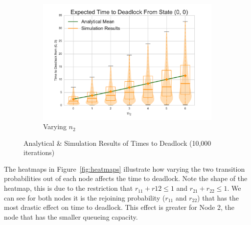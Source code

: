 \documentclass{article}
\begin{document}
\begin{figure}[!htbp]
\begin{subfigure}[b]{0.5\textwidth}
  \includegraphics[width=\textwidth]{images/vary_n2fb}
  \caption{Varying $n_2$}
  \label{fig:timestodeadlockfb_n2}
\end{subfigure}
\caption{Analytical \& Simulation Results of Times to Deadlock (10,000 iterations)}
\label{fig:timestodeadlockfeedback}
\end{figure}

The heatmaps in Figure~\ref{fig:heatmaps} illustrate how varying the two transition probabilities out of each node affects the time to deadlock.
Note the shape of the heatmap, this is due to the restriction that $r_{11} + r{12} \leq 1$ and $r_{21} + r_{22} \leq 1$.
We can see for both nodes it is the rejoining probability ($r_{11}$ and $r_{22}$) that has the most drastic effect on time to deadlock.
This effect is greater for Node 2, the node that has the smaller queueing capacity.
\end{document}
